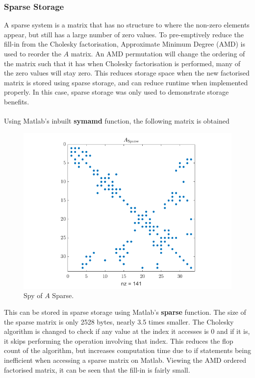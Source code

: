 \documentclass[12pt,a4paper]{article}
\begin{document}
\subsubsection{Sparse Storage}
A sparse system is a matrix that has no structure to where the non-zero elements appear, but still has a large number of zero values. To pre-emptively reduce the fill-in from the Cholesky factorisation, Approximate Minimum Degree (AMD) is used to reorder the $A$ matrix. An AMD permutation will change the ordering of the matrix such that it has when Cholesky factorisation is performed, many of the zero values will stay zero. This reduces storage space when the new factorised matrix is stored using sparse storage, and can reduce runtime when implemented properly. In this case, sparse storage was only used to demonstrate storage benefits.\\\\Using Matlab's inbuilt \textbf{symamd} function, the following matrix is obtained
\begin{figure}[H]
	\includegraphics[width=\linewidth]{images/A_SPARSE.png}
	\caption{Spy of $A$ Sparse.}
	\label{fig:A_SPARSE}
\end{figure}
This can be stored in sparse storage using Matlab's \textbf{sparse} function. The size of the sparse matrix is only 2528 bytes, nearly 3.5 times smaller. The Cholesky algorithm is changed to check if any value at the index it accesses is 0 and if it is, it skips performing the operation involving that index. This reduces the flop count of the algorithm, but increases computation time due to if statements being inefficient when accessing a sparse matrix on Matlab. Viewing the AMD ordered factorised matrix, it can be seen that the fill-in is fairly small.
\end{document}
